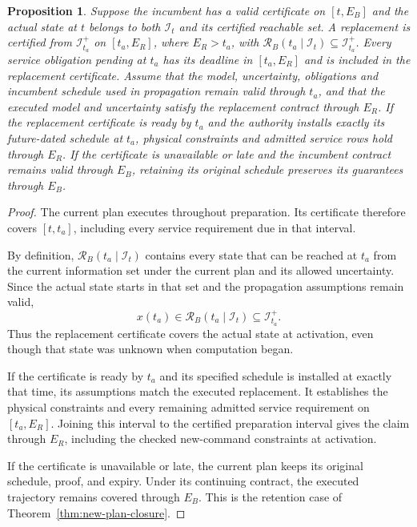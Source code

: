 \documentclass[preprint,12pt]{elsarticle}
\newtheorem{proposition}{Proposition}
\begin{document}
\begin{proposition}
\label{prop:planned-handover}
Suppose the incumbent has a valid certificate on $[t,E_B]$ and the
actual state at $t$ belongs to both $\mathcal I_t$ and its certified
reachable set. A replacement is certified from $\mathcal I_{t_a}^+$ on
$[t_a,E_R]$, where $E_R>t_a$, with
$\mathcal R_B(t_a\mid\mathcal I_t)\subseteq\mathcal I_{t_a}^+$.
Every service obligation pending at $t_a$ has its deadline in $[t_a,E_R]$
and is included in the replacement certificate. Assume that the model,
uncertainty, obligations and incumbent schedule used in propagation
remain valid through $t_a$, and that the executed model and uncertainty
satisfy the replacement contract through $E_R$.
If the replacement certificate is ready by
$t_a$ and the authority installs exactly its future-dated schedule at $t_a$,
physical constraints and admitted service rows hold through $E_R$.
If the certificate is unavailable or late and the incumbent contract
remains valid through $E_B$, retaining its original schedule preserves
its guarantees through $E_B$.
\end{proposition}
\begin{proof}
The current plan executes throughout preparation. Its certificate
therefore covers $[t,t_a]$, including every service requirement due in
that interval.

By definition, $\mathcal R_B(t_a\mid\mathcal I_t)$ contains every state
that can be reached at $t_a$ from the current information set under the
current plan and its allowed uncertainty. Since the actual state starts
in that set and the propagation assumptions remain valid,
\[
 x(t_a)\in\mathcal R_B(t_a\mid\mathcal I_t)
          \subseteq\mathcal I_{t_a}^+.
\]
Thus the replacement certificate covers the actual state at activation,
even though that state was unknown when computation began.

If the certificate is ready by $t_a$ and its specified schedule is
installed at exactly that time, its assumptions match the executed
replacement. It establishes the physical constraints and every remaining
admitted service requirement on $[t_a,E_R]$. Joining this interval to the
certified preparation interval gives the claim through $E_R$, including
the checked new-command constraints at activation.

If the certificate is unavailable or late, the current plan keeps its
original schedule, proof, and expiry. Under its continuing contract, the
executed trajectory remains covered through $E_B$. This is the retention
case of Theorem~\ref{thm:new-plan-closure}.
\end{proof}
\end{document}
